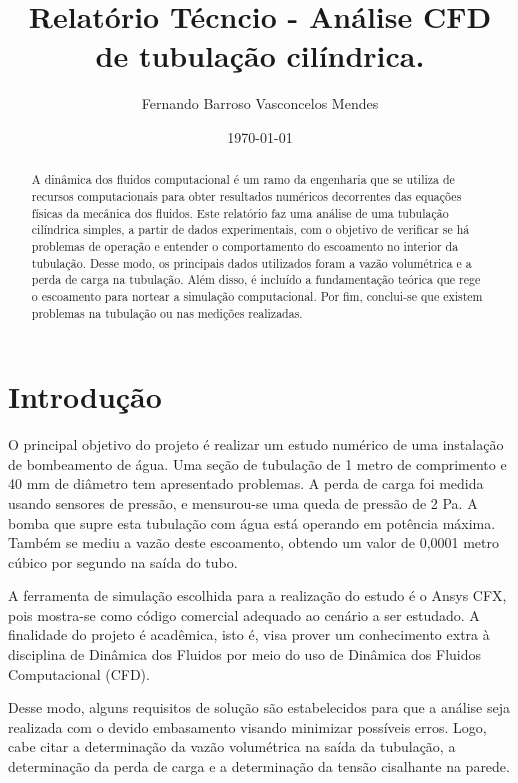 \documentclass[12pt]{article}
\begin{document}
\title{Relatório Técncio - Análise CFD de tubulação cilíndrica.}
\author{Fernando Barroso Vasconcelos Mendes}
\date{\today}
\maketitle

\begin{abstract}
A dinâmica dos fluidos computacional é um ramo da engenharia que se utiliza de recursos computacionais para obter resultados numéricos decorrentes das equações físicas da mecânica dos fluidos. Este relatório faz uma análise de uma tubulação cilíndrica simples, a partir de dados experimentais, com o objetivo de verificar se há problemas de operação e entender o comportamento do escoamento no interior da tubulação. Desse modo, os principais dados utilizados foram a vazão volumétrica e a perda de carga na tubulação. Além disso, é incluído a fundamentação teórica que rege o escoamento para nortear a simulação computacional. Por fim, conclui-se que existem problemas na tubulação ou nas medições realizadas.
\end{abstract}


\section{Introdução}


O principal objetivo do projeto é realizar um estudo numérico de uma instalação de bombeamento de água. Uma seção de tubulação de 1 metro de comprimento e 40 mm de diâmetro tem apresentado problemas. A perda de carga foi medida usando sensores de pressão, e mensurou-se uma queda de pressão de 2 Pa. A bomba que supre esta tubulação com água está operando em potência máxima. Também se mediu a vazão deste escoamento, obtendo um valor de 0,0001 metro cúbico por segundo na saída do tubo.

A ferramenta de simulação escolhida para a realização do estudo é o Ansys CFX, pois mostra-se como código comercial adequado ao cenário a ser estudado. A finalidade do projeto é acadêmica, isto é, visa prover um conhecimento extra à disciplina de Dinâmica dos Fluidos por meio do uso de Dinâmica dos Fluidos Computacional (CFD).

Desse modo, alguns requisitos de solução são estabelecidos para que a análise seja realizada com o devido embasamento visando minimizar possíveis erros. Logo, cabe citar a determinação da vazão volumétrica na saída da tubulação, a determinação da perda de carga e a determinação da tensão cisalhante na parede.
\end{document}
